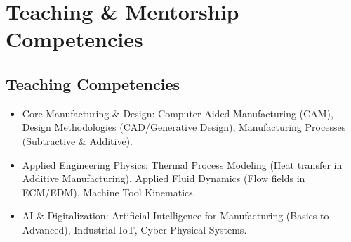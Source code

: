 \documentclass{resume}
\begin{document}
\vspace{5mm}
%       


\section{Teaching \& Mentorship Competencies}
\subsection{Teaching Competencies}
\begin{itemize}[parsep=0.5ex]
  \item {Core Manufacturing \& Design}: Computer-Aided Manufacturing (CAM), Design Methodologies (CAD/Generative Design), Manufacturing Processes (Subtractive \& Additive).
  \item {Applied Engineering Physics}: Thermal Process Modeling (Heat transfer in Additive Manufacturing), Applied Fluid Dynamics (Flow fields in ECM/EDM), Machine Tool Kinematics.
  \item {AI \& Digitalization}: Artificial Intelligence for Manufacturing (Basics to Advanced), Industrial IoT, Cyber-Physical Systems.
\end{itemize}
\end{document}

